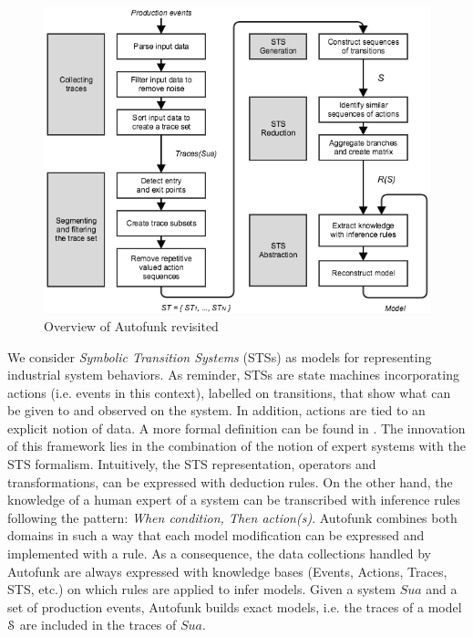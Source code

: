 \begin{figure}[ht]
\includegraphics[width=1.0\linewidth]{figures/autofunk.png}

\caption{Overview of Autofunk revisited}
\label{fig:prodsystems:autofunk-overview}
\end{figure}

We consider \textit{Symbolic Transition Systems} (STSs) as models
for representing industrial system behaviors. As reminder, STSs
are state machines incorporating actions (i.e. events in this
context), labelled on transitions, that show what can be given to
and observed on the system. In addition, actions are tied to an
explicit notion of data. A more formal definition can be found
in .
The innovation of this framework lies in
the combination of the notion of expert systems with the STS
formalism. Intuitively, the STS representation, operators and
transformations, can be expressed with deduction rules. On the
other hand, the knowledge of a human expert of a system can be
transcribed with inference rules following the pattern:
\textit{When condition, Then action(s)}. Autofunk combines both
domains in such a way that each model modification can be
expressed and implemented with a rule. As a consequence, the data
collections handled by Autofunk are always expressed with
knowledge bases (Events, Actions, Traces, STS, etc.) on which
rules are applied to infer models. Given a system $Sua$ and a set
of production events, Autofunk builds exact models, i.e. the
traces of a model $\EuScript{S}$ are included in the traces of
$Sua$.

